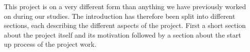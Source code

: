 This project is on a very different form than anything we have previously worked on during our studies.
The introduction has therefore been split into different sections, each describing the different aspects of the project.
First a short section about the project itself and its motivation followed by a section about the start up process of the project work.
